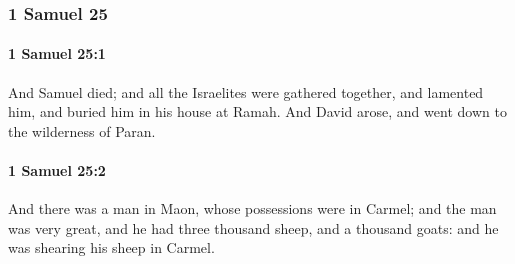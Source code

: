 	\subsubsection{1 Samuel 25} %
		\label{1SAMUEL-25}

		\paragraph{1 Samuel 25:1} %
			\label{1SAMUEL-25-1}

			And Samuel died; and all the Israelites were gathered together, and lamented him, and buried him in his house at Ramah. And David arose, and went down to the wilderness of Paran.


		\paragraph{1 Samuel 25:2} %
			\label{1SAMUEL-25-2}

			And there was a man in Maon, whose possessions were in Carmel; and the man was very great, and he had three thousand sheep, and a thousand goats: and he was shearing his sheep in Carmel.

